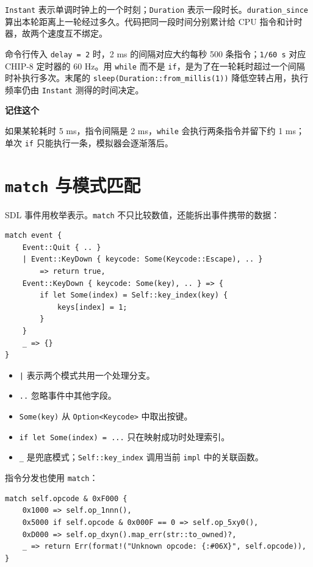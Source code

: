 \documentclass[UTF8,11pt,a4paper]{ctexart}
\newenvironment{keypoint}{
  \par\medskip\noindent\begingroup\setlength{\fboxsep}{11pt}
  \begin{lrbox}{\keybox}\begin{minipage}{\dimexpr\textwidth-2\fboxsep-3pt\relax}
  {\footnotesize\sffamily\bfseries\color{accent}记住这个}\par\smallskip\color{ink}
}{
  \end{minipage}\end{lrbox}\colorbox{pale}{\usebox{\keybox}}\endgroup\par\medskip
}
\begin{document}
\texttt{Instant} 表示单调时钟上的一个时刻；\texttt{Duration} 表示一段时长。\texttt{duration\_since} 算出本轮距离上一轮经过多久。代码把同一段时间分别累计给 CPU 指令和计时器，故两个速度互不绑定。

命令行传入 \texttt{delay = 2} 时，2 ms 的间隔对应大约每秒 500 条指令；\texttt{1/60 s} 对应 CHIP-8 定时器的 60 Hz。用 \texttt{while} 而不是 \texttt{if}，是为了在一轮耗时超过一个间隔时补执行多次。末尾的 \texttt{sleep(Duration::from\_millis(1))} 降低空转占用，执行频率仍由 \texttt{Instant} 测得的时间决定。

\begin{keypoint}
如果某轮耗时 5 ms，指令间隔是 2 ms，\texttt{while} 会执行两条指令并留下约 1 ms；单次 \texttt{if} 只能执行一条，模拟器会逐渐落后。
\end{keypoint}

\section{\texttt{match} 与模式匹配}

SDL 事件用枚举表示。\texttt{match} 不只比较数值，还能拆出事件携带的数据：

\begin{lstlisting}
match event {
    Event::Quit { .. }
    | Event::KeyDown { keycode: Some(Keycode::Escape), .. }
        => return true,
    Event::KeyDown { keycode: Some(key), .. } => {
        if let Some(index) = Self::key_index(key) {
            keys[index] = 1;
        }
    }
    _ => {}
}
\end{lstlisting}

\begin{itemize}
  \item \texttt{|} 表示两个模式共用一个处理分支。
  \item \texttt{..} 忽略事件中其他字段。
  \item \texttt{Some(key)} 从 \texttt{Option<Keycode>} 中取出按键。
  \item \texttt{if let Some(index) = ...} 只在映射成功时处理索引。
  \item \texttt{\_} 是兜底模式；\texttt{Self::key\_index} 调用当前 \texttt{impl} 中的关联函数。
\end{itemize}

指令分发也使用 \texttt{match}：

\begin{lstlisting}
match self.opcode & 0xF000 {
    0x1000 => self.op_1nnn(),
    0x5000 if self.opcode & 0x000F == 0 => self.op_5xy0(),
    0xD000 => self.op_dxyn().map_err(str::to_owned)?,
    _ => return Err(format!("Unknown opcode: {:#06X}", self.opcode)),
}
\end{lstlisting}
\end{document}
